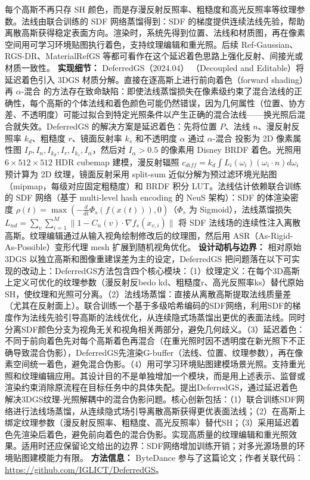 每个高斯不再只存 SH 颜色，而是存漫反射反照率、粗糙度和高光反照率等纹理参数。法线由联合训练的 SDF 网络蒸馏得到：SDF 的梯度提供连续法线先验，帮助离散高斯获得稳定表面方向。渲染时，系统先得到位置、法线和材质图，再在像素空间用可学习环境贴图执行着色，支持纹理编辑和重光照。后续 Ref-Gaussian、RGS-DR、MaterialRefGS 等都可看作在这个延迟着色思路上强化反射、间接光或材质一致性。
\textbf{实现细节：} DeferredGS（2024.04） （Decoupled and Editable）将延迟着色引入 3DGS 材质分解。直接在逐高斯上进行前向着色（forward shading）再 $\alpha$-混合 的方法存在致命缺陷：即使法线蒸馏损失在像素级约束了混合法线的正确性，每个高斯的个体法线和着色颜色可能仍然错误，因为几何属性（位置、协方差、不透明度）可能过拟合到特定光照条件以产生正确的混合法线——换光照后混合就失效。DeferredGS 的解决方案是延迟着色：先将位置 $P$、法线 $n$、漫反射反照率 $k_d$、粗糙度 $r$、镜面反射率 $k_s$ 和不透明度 $\alpha$ 通过 $\alpha$-混合 投影为 2D 像素属性图 $I_P, I_n, I_{k_d}, I_r, I_{k_s}, I_\alpha$，然后对 $I_\alpha > 0.5$ 的像素用 Disney BRDF 着色。光照用 $6\times512\times512$ HDR cubemap 建模，漫反射辐照 $c_{diff} = k_d \int L_i(\omega_i)(\omega_i \cdot n) d\omega_i$ 预计算为 2D 纹理，镜面反射采用 split-sum 近似分解为预过滤环境光贴图（mipmap，每级对应固定粗糙度）和 BRDF 积分 LUT。法线估计依赖联合训练的 SDF 网络（基于 multi-level hash encoding 的 NeuS 架构）：SDF 的体渲染密度 $\rho(t) = \max(-\frac{d}{dt}\Phi_s(f(x(t))), 0)$（$\Phi_s$ 为 Sigmoid），法线蒸馏损失 $L_{nd} = \sum_v \sum_{i=1}^M \|1 - C_n(v) \cdot \nabla f_s(x_{v,i})\|$ 将 SDF 法线场的连续性注入离散高斯。纹理编辑通过从输入视角绘制修改后的纹理图，然后用 ASR（As-Rigid-As-Possible）变形代理 mesh 扩展到随机视角优化。
\textbf{设计动机与边界：} 相对原始 3DGS 以独立高斯和图像重建误差为主的设定，DeferredGS 把问题落在以下可实现的改动上：DeferredGS方法包含四个核心模块：（1）纹理定义：在每个3D高斯上定义可优化的纹理参数（漫反射反bedo kd、粗糙度r、高光反照率ks）替代原始SH，使纹理和光照可分离。（2）法线场蒸馏：直接从离散高斯提取法线质量差（尤其在反射面上）。联合训练一个基于多级哈希编码的SDF网络，利用SDF的梯度作为法线先验引导高斯的法线优化，从连续隐式场蒸馏出更优的表面法线。同时分离SDF颜色分支为视角无关和视角相关两部分，避免几何歧义。（3）延迟着色：不同于前向着色先对每个高斯着色再混合（在重光照时因不透明度在新光照下不正确导致混合伪影），DeferredGS先渲染G-buffer（法线、位置、纹理参数），再在像素空间统一着色，避免混合伪影。（4）用可学习环境贴图建模场景光照。支持重光照和纹理编辑应用。其设计目的不是单独增加一个模块，而是用上述表示、监督或渲染约束消除原流程在目标任务中的具体失配。提出DeferredGS，通过延迟着色解决3DGS纹理-光照解耦中的混合伪影问题。核心创新包括：（1）联合训练SDF网络进行法线场蒸馏，从连续隐式场引导离散高斯获得更优表面法线；（2）在高斯上绑定纹理参数（漫反射反照率、粗糙度、高光反照率）替代SH；（3）采用延迟着色先渲染后着色，避免前向着色的混合伪影。实现高质量的纹理编辑和重光照效果。适用时还应保留论文给出的边界：SDF网络增加训练开销；对多光源场景的环境贴图建模能力有限。
\textbf{方法信息：} ByteDance 参与了这篇论文；作者关联代码：\url{https://github.com/IGLICT/DeferredGS}。



